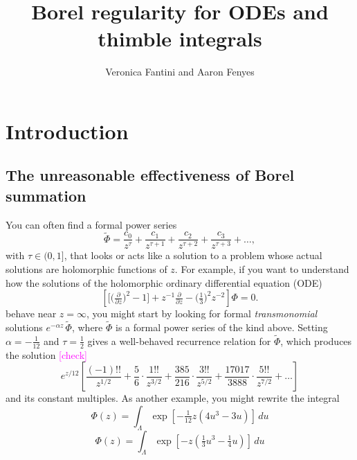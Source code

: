\documentclass{article}
\title{Borel regularity for ODEs and thimble integrals}
\author{Veronica Fantini and Aaron Fenyes}
\theoremstyle{definition}
\newcommand{\series}[1]{\tilde{#1}}
\begin{document}
\maketitle

\section{Introduction}
\subsection{The unreasonable effectiveness of Borel summation}\label{intro:summation}
You can often find a formal power series %
\[ \series{\Phi} = \frac{c_0}{z^\tau} + \frac{c_1}{z^{\tau+1}} + \frac{c_2}{z^{\tau+2}} + \frac{c_3}{z^{\tau+3}} + \ldots, \]
with $\tau \in (0, 1]$, that looks or acts like a solution to a problem whose actual solutions are holomorphic functions of $z$. For example, if you want to understand how the solutions of the holomorphic ordinary differential equation (ODE)
\begin{equation}
\left[ \big[ \big(\tfrac{\partial}{\partial z}\big)^2 - 1 \big] + z^{-1} \tfrac{\partial}{\partial z} - \big(\tfrac{1}{3}\big)^2 z^{-2} \right] \Phi= 0. \label{eqn:bessel-rescaled-1}
\end{equation}
behave near $z = \infty$, you might start by looking for formal {\em transmonomial} solutions $e^{-\alpha z}\,\series{\Phi}$, where $\series{\Phi}$ is a formal power series of the kind above. Setting $\alpha = -\tfrac{1}{12}$ and $\tau = \tfrac{1}{2}$ gives a well-behaved recurrence relation for $\series{\Phi}$, which produces the solution \textcolor{magenta}{[check]}
\begin{equation}
e^{z/12} \left[ \frac{(-1)!!}{z^{1/2}} + \frac{5}{6} \cdot \frac{1!!}{z^{3/2}} + \frac{385}{216} \cdot \frac{3!!}{z^{5/2}} + \frac{17017}{3888} \cdot \frac{5!!}{z^{7/2}} + \ldots \right] \label{series:bessel-ex}
\end{equation}
and its constant multiples. As another example, you might rewrite the integral
\color{DodgerBlue}
\[ \Phi(z) = \int_{\Lambda} \exp\left[-\tfrac{1}{12} z \left(4u^3 - 3u\right)\right]\,du \]
\color{black}
\[ \Phi(z) = \int_{\Lambda} \exp\left[-z \left(\tfrac{1}{3} u^3 - \tfrac{1}{4} u\right)\right]\,du \]
\end{document}
